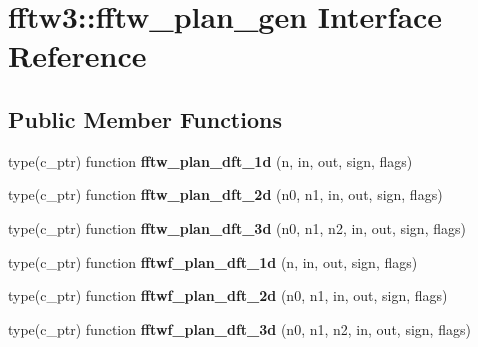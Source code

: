 \hypertarget{interfacefftw3_1_1fftw__plan__gen}{}\section{fftw3\+:\+:fftw\+\_\+plan\+\_\+gen Interface Reference}
\label{interfacefftw3_1_1fftw__plan__gen}
\subsection*{Public Member Functions}
\begin{DoxyCompactItemize}
\item 
type(c\+\_\+ptr) function {\bfseries fftw\+\_\+plan\+\_\+dft\+\_\+1d} (n, in, out, sign, flags)\hypertarget{interfacefftw3_1_1fftw__plan__gen_a5d742a5b987f4046d2c4738851bf0d64}{}\label{interfacefftw3_1_1fftw__plan__gen_a5d742a5b987f4046d2c4738851bf0d64}

\item 
type(c\+\_\+ptr) function {\bfseries fftw\+\_\+plan\+\_\+dft\+\_\+2d} (n0, n1, in, out, sign, flags)\hypertarget{interfacefftw3_1_1fftw__plan__gen_a01b5e60820f81eca02513e97f808888f}{}\label{interfacefftw3_1_1fftw__plan__gen_a01b5e60820f81eca02513e97f808888f}

\item 
type(c\+\_\+ptr) function {\bfseries fftw\+\_\+plan\+\_\+dft\+\_\+3d} (n0, n1, n2, in, out, sign, flags)\hypertarget{interfacefftw3_1_1fftw__plan__gen_ad8ec369da3edc0091a8d18ae8c48f634}{}\label{interfacefftw3_1_1fftw__plan__gen_ad8ec369da3edc0091a8d18ae8c48f634}

\item 
type(c\+\_\+ptr) function {\bfseries fftwf\+\_\+plan\+\_\+dft\+\_\+1d} (n, in, out, sign, flags)\hypertarget{interfacefftw3_1_1fftw__plan__gen_ad7629782e1d179e22ed298c6d1ec156a}{}\label{interfacefftw3_1_1fftw__plan__gen_ad7629782e1d179e22ed298c6d1ec156a}

\item 
type(c\+\_\+ptr) function {\bfseries fftwf\+\_\+plan\+\_\+dft\+\_\+2d} (n0, n1, in, out, sign, flags)\hypertarget{interfacefftw3_1_1fftw__plan__gen_a761becf5e961f20c9cde307d0d2c8a6a}{}\label{interfacefftw3_1_1fftw__plan__gen_a761becf5e961f20c9cde307d0d2c8a6a}

\item 
type(c\+\_\+ptr) function {\bfseries fftwf\+\_\+plan\+\_\+dft\+\_\+3d} (n0, n1, n2, in, out, sign, flags)\hypertarget{interfacefftw3_1_1fftw__plan__gen_a82d48888372465362dd0d26bd0b6efcc}{}\label{interfacefftw3_1_1fftw__plan__gen_a82d48888372465362dd0d26bd0b6efcc}


\end{DoxyCompactItemize}
